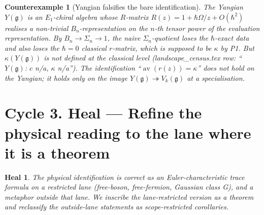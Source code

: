 \documentclass[11pt]{article}
\newtheorem*{heal}{Heal}
\newtheorem*{counterexample}{Counterexample}
\theoremstyle{definition}
\DeclareMathOperator{\av}{av}
\begin{document}
\begin{counterexample}[Yangian falsifies the bare identification]
The Yangian $Y(\mathfrak g)$ is an $E_1$-chiral algebra whose $R$-matrix
$R(z) = 1 + \hbar\Omega/z + O(\hbar^2)$ realises a non-trivial
$B_n$-representation on the $n$-th tensor power of the evaluation
representation. By $B_n \to \Sigma_n \to 1$, the naive $\Sigma_n$-quotient
loses the $\hbar$-exact data \emph{and also} loses the $\hbar = 0$
classical $r$-matrix, which is supposed to be $\kappa$ by P1. But
$\kappa(Y(\mathfrak g))$ is not defined at the classical level
(landscape\_census.tex row: ``$Y(\mathfrak g)$: $c$ n/a, $\kappa$ n/a'').
The identification ``$\av(r(z)) = \kappa$'' does not hold on the
Yangian; it holds only on the image $Y(\mathfrak g) \twoheadrightarrow
V_k(\mathfrak g)$ at a specialisation.
\end{counterexample}

\section*{Cycle 3. Heal --- Refine the physical reading to the lane where it is a theorem}

\begin{heal}
The physical identification is \emph{correct as an Euler-characteristic
trace formula} on a restricted lane (free-boson, free-fermion, Gaussian
class G), and \emph{a metaphor} outside that lane. We inscribe the
lane-restricted version as a theorem and reclassify the outside-lane
statements as scope-restricted corollaries.
\end{heal}
\end{document}
